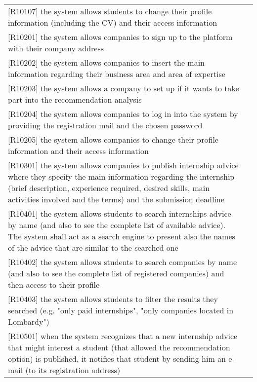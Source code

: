 \begin{table} [h!]
\begin{tabular}{ || P{7.5cm} P{7.5cm} || }
					[R10107] the system allows students to change their profile information (including the CV) and their access information & \\
					
					[R10201] the system allows companies to sign up to the platform with their company address & \\
					
					[R10202] the system allows companies to insert the main information regarding their business area and area of expertise & \\
					
					[R10203] the system allows a company to set up if it wants to take part into the recommendation analysis & \\
					
					[R10204] the system allows companies to log in into the system by providing the registration mail and the chosen password & \\
					
					[R10205] the system allows companies to change their profile information and their access information & \\
					
					[R10301] the system allows companies to publish internship advice where they specify the main information regarding the internship (brief description, experience required, desired skills, main activities involved and the terms) and the submission deadline & \\
					
					[R10401] the system allows students to search internships advice by name (and also to see the complete list of available advice). The system shall act as a search engine to present also the names of the advice that are similar to the searched one & \\
					
					[R10402] the system allows students to search companies by name (and also to see the complete list of registered companies) and then access to their profile & \\
					
					[R10403] the system allows students to filter the results they searched (e.g. "only paid internships", "only companies located in Lombardy") & \\
					
					[R10501] when the system recognizes that a new internship advice that might interest a student (that allowed the recommendation option) is published, it notifies that student by sending him an e-mail (to its registration address) & \\
					

\end{tabular}
\end{table}
